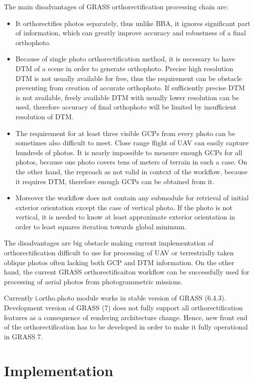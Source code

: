 \documentclass[a4paper,12pt]{article}
\begin{document}
The main disadvantages of GRASS orthorectification processing chain are:
\begin{itemize}
\item It orthorectifies photos separately, thus unlike BBA, it ignores significant part of information,
 which can greatly improve accuracy and robustness of a final orthophoto. 
\item Because of single photo orthorectification method, it is necessary to have DTM of a scene
in order to generate orthophoto. Precise high resolution DTM is not usually available for free, thus the 
requirement can be obstacle preventing from creation of accurate orthophoto. If sufficiently precise 
DTM is not available, freely available DTM with usually lower resolution can be used, therefore  
accuracy of final orthophoto will be limited by insufficient resolution of DTM.
\item The requirement for at least three visible GCPs from every photo can be sometimes also difficult to meet.
Close range flight of UAV can easily capture hundreds of photos.
It is nearly impossible to measure enough GCPs for all photos, because  
one photo covers tens of meters of terrain in such a case. 
On the other hand, the reproach as not valid in context of the workflow, because it requires DTM, therefore 
enough GCPs can be obtained from it.
\item Moreover the workflow does not contain any submodule for retrieval of initial exterior orientation except
 the case of vertical photo.   If the photo 
is not vertical, it is needed to know at least approximate exterior orientation 
in order to least squares iteration towards global minimum.
\end{itemize}

The disadvantages are big obstacle making current implementation of orthorectification difficult to use  
for processing of  UAV or terrestrially taken oblique photos often lacking both GCP and DTM information.
On the other hand, the current GRASS orthorectificaiton workflow can be successfully used for processing
of aerial photos from photogrammetric missions.

Currently i.ortho.photo module works in stable version of GRASS (6.4.3).
Development version of GRASS (7) does not fully support all orthorectification features 
as a consequence of rendering architecture change.
Hence, new front end of the
orthorectification has to be developed in order to make it fully operational 
in GRASS 7. 

\section{Implementation}
\end{document}
